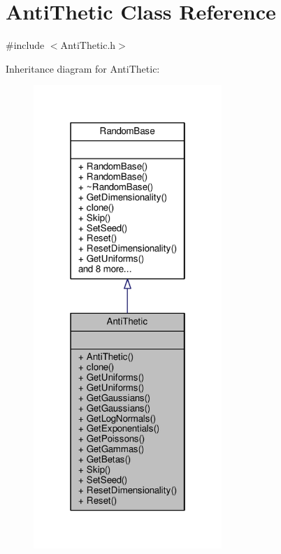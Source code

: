 \hypertarget{classAntiThetic}{}\section{Anti\+Thetic Class Reference}
\label{classAntiThetic}


{\ttfamily \#include $<$Anti\+Thetic.\+h$>$}



Inheritance diagram for Anti\+Thetic\+:
\nopagebreak
\begin{figure}[H]
\begin{center}
\leavevmode
\includegraphics[width=202pt]{classAntiThetic__inherit__graph}
\end{center}
\end{figure}


